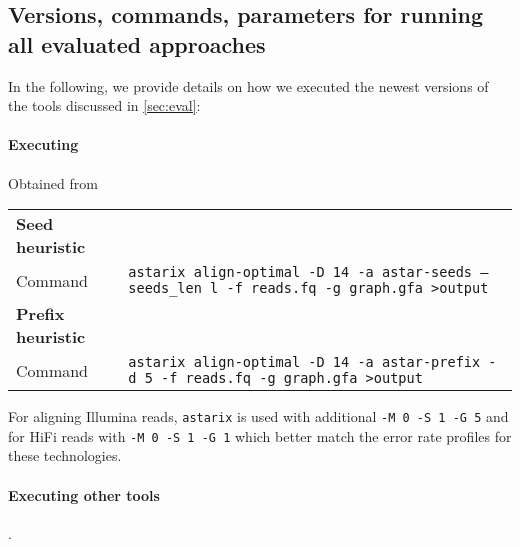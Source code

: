 \subsection{Versions, commands, parameters for running all evaluated approaches} \label{sec:commands}
In the following, we provide details on how we executed the newest versions of
the tools discussed in \cref{sec:eval}:

\paragraph{Executing \astarix} Obtained from \astarixurl \\

\begin{tabular}{lp{9.5cm}}
	\textbf{Seed heuristic} & \\
	\quad Command & \texttt{astarix align-optimal -D 14 -a astar-seeds --seeds\_len l -f reads.fq -g graph.gfa >output} \\
	\textbf{Prefix heuristic} & \\
	\quad Command & \texttt{astarix align-optimal -D 14 -a astar-prefix -d 5 -f reads.fq -g graph.gfa >output} \\
\end{tabular}

For aligning Illumina reads, \texttt{astarix} is used with additional \texttt{-M
0 -S 1 -G 5} and for HiFi reads with \texttt{-M 0 -S 1 -G 1} which better match
the error rate profiles for these technologies.

\paragraph{Executing other tools}. \\

